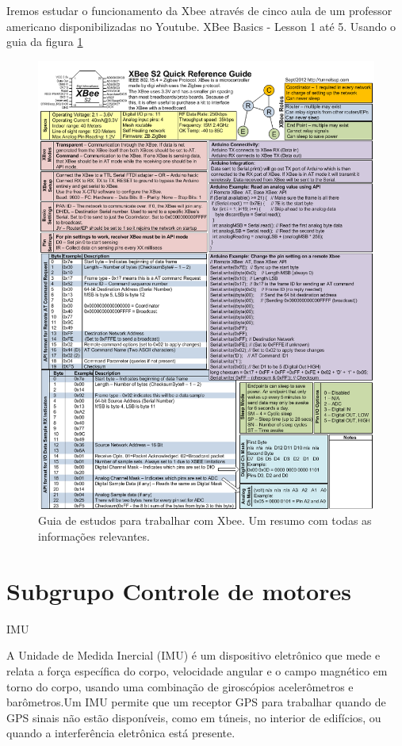 Iremos estudar o funcionamento da Xbee através de cinco aula de um professor americano disponibilizadas no Youtube. XBee Basics - Lesson 1 até 5. Usando o guia da figura \ref{xbeeguide}

 \begin{figure} [!htp]
	\centering
	\includegraphics[scale=0.6]{figuras/xbeeguide}
	\caption{Guia de estudos para trabalhar com Xbee. Um resumo com todas as informações relevantes.}
	\label{xbeeguide}
\end{figure}



\section{Subgrupo Controle de motores}

IMU

A Unidade de Medida Inercial (IMU) é um dispositivo eletrônico que mede e relata a força específica do corpo, velocidade angular e o campo magnético em torno do corpo, usando uma combinação de giroscópios acelerômetros e barômetros.Um IMU permite que um receptor GPS para trabalhar quando de GPS sinais não estão disponíveis, como em túneis, no interior de edifícios, ou quando a interferência eletrônica está presente.

